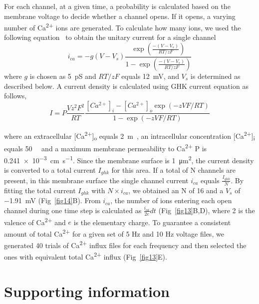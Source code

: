 \documentclass[10pt,letterpaper]{article}
\begin{document}
For each channel, at a given time, a probability is calculated based on the membrane voltage to decide whether a channel opens. If it opens, a varying number of Ca\textsuperscript{2+} ions are generated. To calculate how many ions, we used the following equation~\cite{2013PNAS..11015794T} to obtain the unitary current for a single channel
\begin{equation}i_{ca}=-g(V-V_s)\frac{\exp(\frac{-(V-V_s)}{RT/zF})}{1-\exp(\frac{-(V-V_s)}{RT/zF})}\end{equation}
where $g$ is chosen as \SI{5}{\pico\siemens} and $RT/zF$ equals \SI{12}{\milli\volt}, and $V_s$ is determined as described below. A current density is calculated using GHK current equation as follows, 
\begin{equation}I=P\frac{Vz^2F^2}{RT}\frac{[Ca^{2+}]_i-[Ca^{2+}]_o\exp(-zVF/RT)}{1-\exp(-zVF/RT)}\end{equation}

where an extracellular [Ca\textsuperscript{2+}]\textsubscript{o} equals \SI{2}{\m\Molar}, an intracellular concentration [Ca\textsuperscript{2+}]\textsubscript{i} equals \SI{50}{\nano\Molar} and a maximum membrane permeability to Ca\textsuperscript{2+} P is \SI{0.241e-3}{\cm\per\s}. Since the membrane surface is \SI{1}{\square\um}, the current density is converted to a total current $I_{ghk}$ for this area. If a total of N channels are present, in this membrane surface the single channel current $i_{ca}$ equals $\frac{I_{ghk}}{N}$. By fitting the total current $I_{ghk}$ with $N\times i_{ca}$, we obtained an N of 16 and a $V_s$ of \SI{-1.91}{\milli\volt} (Fig~\ref{fig14}B). From $i_{ca}$, the number of ions entering each open channel during one time step is calculated as $\frac{i_{ca}}{2e}dt$ (Fig~\ref{fig13}B,D), where 2 is the valence of Ca\textsuperscript{2+} and $e$ is the elementary charge. To guarantee a consistent amount of total Ca\textsuperscript{2+} for a given set of 5 Hz and 10 Hz voltage files, we generated 40 trials of Ca\textsuperscript{2+} influx files for each frequency and then selected the ones with equivalent total Ca\textsuperscript{2+} influx (Fig~\ref{fig13}E).


\section*{Supporting information}
\end{document}
